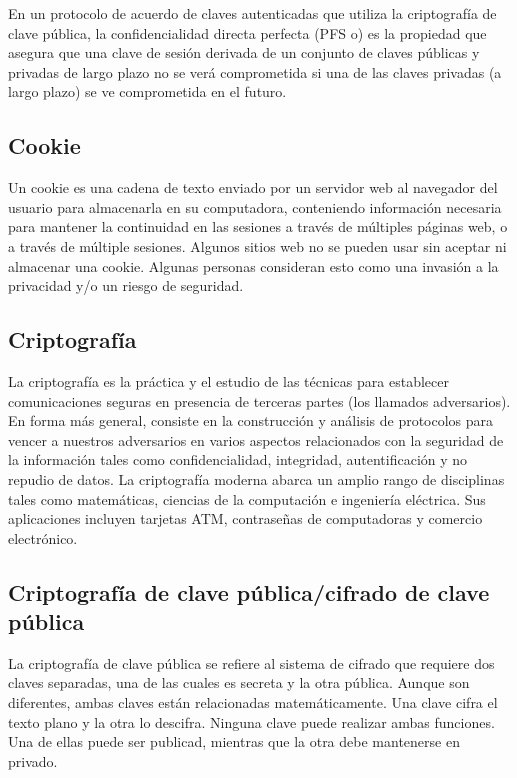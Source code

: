 En un protocolo de acuerdo de claves autenticadas que utiliza la
criptografía de clave pública, la confidencialidad directa perfecta (PFS
o) es la propiedad que asegura que una clave de sesión derivada de un
conjunto de claves públicas y privadas de largo plazo no se verá
comprometida si una de las claves privadas (a largo plazo) se ve
comprometida en el futuro.

\subsection{Cookie}\label{cookie}

Un cookie es una cadena de texto enviado por un servidor web al
navegador del usuario para almacenarla en su computadora, conteniendo
información necesaria para mantener la continuidad en las sesiones a
través de múltiples páginas web, o a través de múltiple sesiones.
Algunos sitios web no se pueden usar sin aceptar ni almacenar una
cookie. Algunas personas consideran esto como una invasión a la
privacidad y/o un riesgo de seguridad.

\subsection{Criptografía}\label{criptografuxeda}

La criptografía es la práctica y el estudio de las técnicas para
establecer comunicaciones seguras en presencia de terceras partes (los
llamados adversarios). En forma más general, consiste en la construcción
y análisis de protocolos para vencer a nuestros adversarios en varios
aspectos relacionados con la seguridad de la información tales como
confidencialidad, integridad, autentificación y no repudio de datos. La
criptografía moderna abarca un amplio rango de disciplinas tales como
matemáticas, ciencias de la computación e ingeniería eléctrica. Sus
aplicaciones incluyen tarjetas ATM, contraseñas de computadoras y
comercio electrónico.

\subsection{Criptografía de clave pública/cifrado de clave
pública}\label{criptografuxeda-de-clave-puxfablicacifrado-de-clave-puxfablica}

La criptografía de clave pública se refiere al sistema de cifrado que
requiere dos claves separadas, una de las cuales es secreta y la otra
pública. Aunque son diferentes, ambas claves están relacionadas
matemáticamente. Una clave cifra el texto plano y la otra lo descifra.
Ninguna clave puede realizar ambas funciones. Una de ellas puede ser
publicad, mientras que la otra debe mantenerse en privado.

